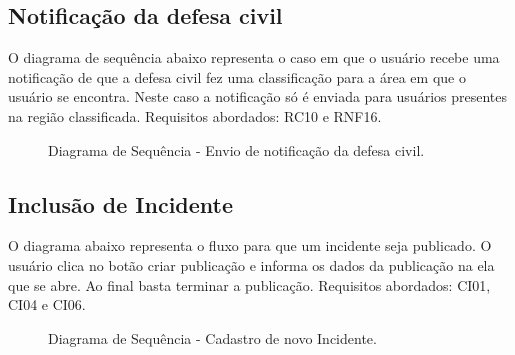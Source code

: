 \documentclass[12pt]{article}
\begin{document}
\subsection{Notificação da defesa civil}
O diagrama de sequência abaixo representa o caso em que o usuário recebe uma notificação de que a defesa civil fez uma classificação para a área em que o usuário se encontra. Neste caso a notificação só é enviada para usuários presentes na região classificada. Requisitos abordados: RC10 e RNF16.
  \begin{figure}[H]
    \caption{\label{fig:dssNotify01} Diagrama de Sequência - Envio de notificação da defesa civil.}
  \end{figure}
\subsection{Inclusão de Incidente}

O diagrama abaixo representa o fluxo para que um incidente seja publicado. O usuário clica no botão criar publicação e informa os dados da publicação na ela que se abre. Ao final basta terminar a publicação. Requisitos abordados: CI01, CI04 e CI06.

  \begin{figure}[H]
    \caption{\label{fig:dssPublic01} Diagrama de Sequência - Cadastro de novo Incidente.}
  \end{figure}
\end{document}
